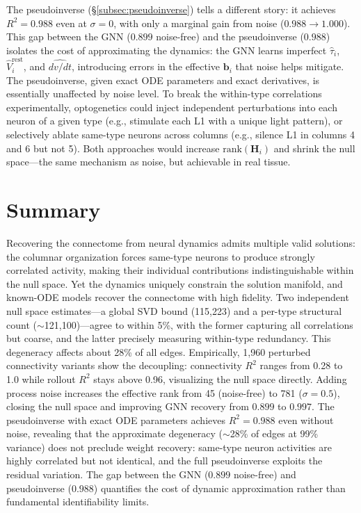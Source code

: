 \documentclass[11pt,a4paper]{article}
\begin{document}
The pseudoinverse (\S\ref{subsec:pseudoinverse}) tells a different story: it achieves $R^2 = 0.988$ even at $\sigma = 0$, with only a marginal gain from noise ($0.988 \to 1.000$). This gap between the GNN ($0.899$ noise-free) and the pseudoinverse ($0.988$) isolates the cost of approximating the dynamics: the GNN learns imperfect $\hat{\tau}_i$, $\hat{V}_i^{\mathrm{rest}}$, and $\widehat{dv/dt}$, introducing errors in the effective $\mathbf{b}_i$ that noise helps mitigate. The pseudoinverse, given exact ODE parameters and exact derivatives, is essentially unaffected by noise level.
To break the within-type correlations experimentally, optogenetics could inject independent perturbations into each neuron of a given type (e.g., stimulate each L1 with a unique light pattern), or selectively ablate same-type neurons across columns (e.g., silence L1 in columns 4 and 6 but not 5). Both approaches would increase $\text{rank}(\mathbf{H}_i)$ and shrink the null space---the same mechanism as noise, but achievable in real tissue.

\section{Summary}

Recovering the connectome from neural dynamics admits multiple valid solutions: the columnar organization forces same-type neurons to produce strongly correlated activity, making their individual contributions indistinguishable within the null space. Yet the dynamics uniquely constrain the solution manifold, and known-ODE models recover the connectome with high fidelity. Two independent null space estimates---a global SVD bound (115,223) and a per-type structural count ($\sim$121,100)---agree to within 5\%, with the former capturing all correlations but coarse, and the latter precisely measuring within-type redundancy. This degeneracy affects about 28\% of all edges. Empirically, 1,960 perturbed connectivity variants show the decoupling: connectivity $R^2$ ranges from 0.28 to 1.0 while rollout $R^2$ stays above 0.96, visualizing the null space directly. Adding process noise increases the effective rank from 45 (noise-free) to 781 ($\sigma = 0.5$), closing the null space and improving GNN recovery from $0.899$ to $0.997$. The pseudoinverse with exact ODE parameters achieves $R^2 = 0.988$ even without noise, revealing that the approximate degeneracy ($\sim$28\% of edges at 99\% variance) does not preclude weight recovery: same-type neuron activities are highly correlated but not identical, and the full pseudoinverse exploits the residual variation. The gap between the GNN ($0.899$ noise-free) and pseudoinverse ($0.988$) quantifies the cost of dynamic approximation rather than fundamental identifiability limits.
\end{document}
